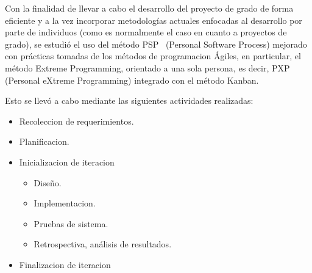 Con la finalidad de llevar a cabo el desarrollo del proyecto de grado de forma eficiente y a la vez incorporar metodologías actuales enfocadas al desarrollo por parte de individuos (como es normalmente el caso en cuanto a proyectos de grado), se estudió el uso del método PSP~\citep{Humphrey200503} (Personal Software Process) mejorado con prácticas tomadas de los métodos de programacion Ágiles, en particular, el método Extreme Programming, orientado a una sola persona, es decir, PXP~\citep{pxppaper} (Personal eXtreme Programming) integrado con el método Kanban.

Esto se llevó a cabo mediante las siguientes actividades realizadas:

\begin{itemize}
	\itemsep1pt \parskip1pt 
	\item Recoleccion de requerimientos.
	\item Planificacion.
	\item Inicializacion de iteracion
	\begin{itemize}
		\item Diseño.
		\item Implementacion.
		\item Pruebas de sistema.
		\item Retrospectiva, análisis de resultados.
	\end{itemize}
	\item Finalizacion de iteracion
\end{itemize}